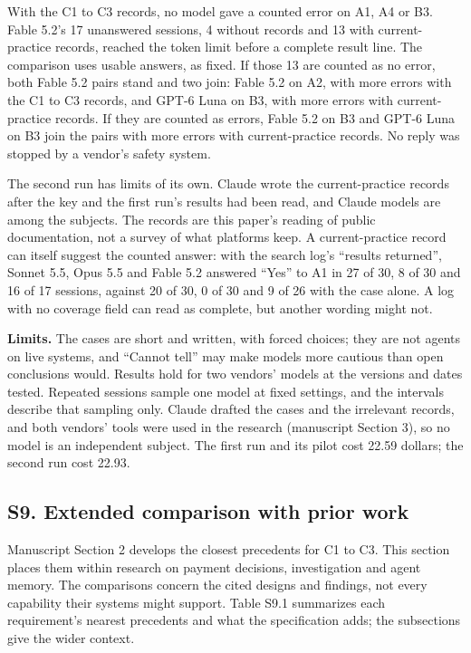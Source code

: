 \documentclass[
  11pt,
]{article}
\begin{document}
With the C1 to C3 records, no model gave a counted error on A1, A4 or
B3. Fable 5.2's 17 unanswered sessions, 4 without records and 13 with
current-practice records, reached the token limit before a complete
result line. The comparison uses usable answers, as fixed. If those 13
are counted as no error, both Fable 5.2 pairs stand and two join: Fable
5.2 on A2, with more errors with the C1 to C3 records, and \mbox{GPT-6}
Luna on B3, with more errors with current-practice records. If they are
counted as errors, Fable 5.2 on B3 and \mbox{GPT-6} Luna on B3 join the
pairs with more errors with current-practice records. No reply was
stopped by a vendor's safety system.

The second run has limits of its own. Claude wrote the current-practice
records after the key and the first run's results had been read, and
Claude models are among the subjects. The records are this paper's
reading of public documentation, not a survey of what platforms keep. A
current-practice record can itself suggest the counted answer: with the
search log's ``results returned'', Sonnet 5.5, Opus 5.5 and Fable 5.2
answered ``Yes'' to A1 in 27 of 30, 8 of 30 and 16 of 17 sessions,
against 20 of 30, 0 of 30 and 9 of 26 with the case alone. A log with no
coverage field can read as complete, but another wording might not.

\textbf{Limits.} The cases are short and written, with forced choices;
they are not agents on live systems, and ``Cannot tell'' may make models
more cautious than open conclusions would. Results hold for two vendors'
models at the versions and dates tested. Repeated sessions sample one
model at fixed settings, and the intervals describe that sampling only.
Claude drafted the cases and the irrelevant records, and both vendors'
tools were used in the research (manuscript Section 3), so no model is
an independent subject. The first run and its pilot cost 22.59 dollars;
the second run cost 22.93.

\FloatBarrier

\hypertarget{s9.-extended-comparison-with-prior-work}{%
\subsection{S9. Extended comparison with prior
work}\label{s9.-extended-comparison-with-prior-work}}

\suppressfloats[t]

Manuscript Section 2 develops the closest precedents for C1 to C3. This
section places them within research on payment decisions, investigation
and agent memory. The comparisons concern the cited designs and
findings, not every capability their systems might support. Table S9.1
summarizes each requirement's nearest precedents and what the
specification adds; the subsections give the wider context.
\end{document}
